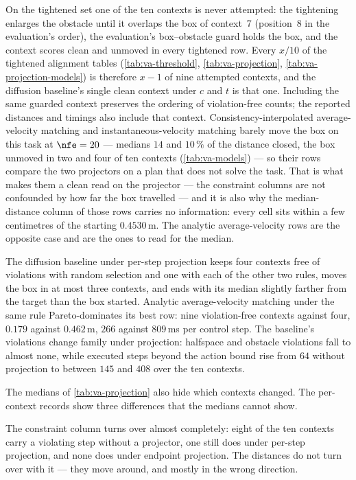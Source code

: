 On the tightened set one of the ten contexts is never attempted: the tightening enlarges the
obstacle until it overlaps the box of context~7 (position~8 in the evaluation's order), the evaluation's
box--obstacle guard holds the box, and
the context scores clean and unmoved in every tightened row. Every $x/10$ of the tightened alignment tables
(\autoref{tab:va-threshold}, \autoref{tab:va-projection}, \autoref{tab:va-projection-models}) is therefore
$x-1$ of nine attempted contexts, and the diffusion baseline's single clean context under $c$ and $t$ is
that one. Including the same guarded context preserves the ordering of violation-free counts; the reported
distances and timings also include that context.
Consistency-interpolated average-velocity matching and instantaneous-velocity matching barely
move the box on this task at $\nfe=20$ --- medians $14$ and $10\,\%$ of the distance closed, the box unmoved
in two and four of ten contexts (\autoref{tab:va-models}) --- so their rows compare the two
projectors on a plan that does not solve the task. That is what makes them a clean read on the
projector --- the constraint columns are not confounded by how far the box travelled --- and it is also
why the median-distance column of those rows carries no information: every cell sits within a few
centimetres of the starting $0.4530$\,m. The analytic average-velocity rows are the opposite case and are
the ones to read for the median.

The diffusion baseline under per-step projection keeps four contexts free of violations with random
selection and one with each of the other two rules, moves the box in at most three contexts, and ends with
its median slightly farther from the target than the box started. Analytic average-velocity matching under
the same rule Pareto-dominates its best row: nine violation-free contexts against four, $0.179$ against $0.462$\,m,
$266$ against $809$\,ms per control step. The baseline's violations change family under projection:
halfspace and obstacle violations fall to almost none, while executed steps beyond the action bound rise
from $64$ without projection to between $145$ and $408$ over the ten contexts.

The medians of \autoref{tab:va-projection} also hide which contexts changed. The per-context records
show three differences that the medians cannot show.

The constraint column turns over almost completely: eight of the ten contexts carry a violating step
without a projector, one still does under per-step projection, and none does under endpoint projection.
The distances do not turn over with it --- they move around, and mostly in the wrong direction.

